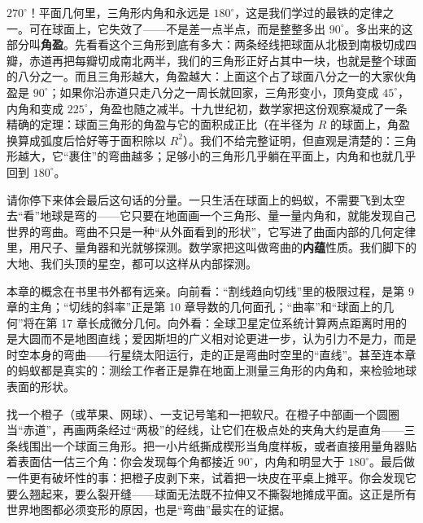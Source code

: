 $270^\circ$！平面几何里，三角形内角和永远是 $180^\circ$，这是我们学过的最铁的定律之一。可在球面上，它失效了——不是差一点半点，而是整整多出 $90^\circ$。多出来的这部分叫\textbf{角盈}。先看看这个三角形到底有多大：两条经线把球面从北极到南极切成四瓣，赤道再把每瓣切成南北两半，我们的三角形正好占其中一块，也就是整个球面的八分之一。而且三角形越大，角盈越大：上面这个占了球面八分之一的大家伙角盈是 $90^\circ$；如果你沿赤道只走八分之一周长就回家，三角形变小，顶角变成 $45^\circ$，内角和变成 $225^\circ$，角盈也随之减半。十九世纪初，数学家把这份观察凝成了一条精确的定理：球面三角形的角盈与它的面积成正比（在半径为 $R$ 的球面上，角盈换算成弧度后恰好等于面积除以 $R^2$）。我们不给完整证明，但直观是清楚的：三角形越大，它``裹住''的弯曲越多；足够小的三角形几乎躺在平面上，内角和也就几乎回到 $180^\circ$。

请你停下来体会最后这句话的分量。一只生活在球面上的蚂蚁，不需要飞到太空去``看''地球是弯的——它只要在地面画一个三角形、量一量内角和，就能发现自己世界的弯曲。弯曲不只是一种``从外面看到的形状''，它写进了曲面内部的几何定律里，用尺子、量角器和光就够探测。数学家把这叫做弯曲的\textbf{内蕴}性质。我们脚下的大地、我们头顶的星空，都可以这样从内部探测。

\begin{lianjie}
本章的概念在书里书外都有远亲。向前看：``割线趋向切线''里的极限过程，是第 9 章的主角；``切线的斜率''正是第 10 章导数的几何面孔；``曲率''和``球面上的几何''将在第 17 章长成微分几何。向外看：全球卫星定位系统计算两点距离时用的是大圆而不是地图直线；爱因斯坦的广义相对论更进一步，认为引力不是力，而是时空本身的弯曲——行星绕太阳运行，走的正是弯曲时空里的``直线''。甚至连本章的蚂蚁都是真实的：测绘工作者正是靠在地面上测量三角形的内角和，来检验地球表面的形状。
\end{lianjie}

\begin{shiyan}
找一个橙子（或苹果、网球）、一支记号笔和一把软尺。在橙子中部画一个圆圈当``赤道''，再画两条经过``两极''的经线，让它们在极点处的夹角大约是直角——三条线围出一个球面三角形。把一小片纸撕成楔形当角度样板，或者直接用量角器贴着表面估一估三个角：你会发现每个角都接近 $90^\circ$，内角和明显大于 $180^\circ$。最后做一件更有破坏性的事：把橙子皮剥下来，试着把一块皮在平桌上摊平。你会发现它要么翘起来，要么裂开缝——球面无法既不拉伸又不撕裂地摊成平面。这正是所有世界地图都必须变形的原因，也是``弯曲''最实在的证据。
\end{shiyan}

